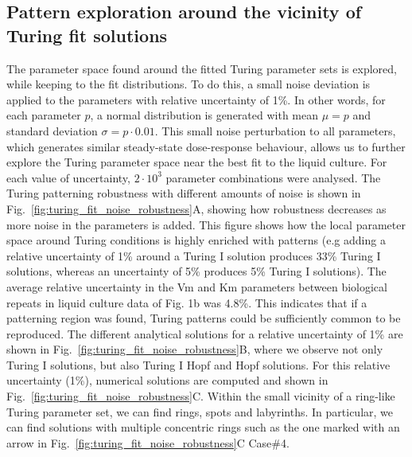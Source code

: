 \subsection{Pattern exploration around the vicinity of Turing fit solutions}
The parameter space found around the fitted Turing parameter sets is explored, while keeping to the fit distributions. To do this, a small noise deviation is applied to the parameters with relative uncertainty of 1\%.
In other words, for each parameter $p$, a normal distribution is generated with mean $\mu=p$ and standard deviation $\sigma=p\cdot 0.01$.
This small noise perturbation to all parameters, which generates similar steady-state dose-response behaviour, allows us to further explore the Turing parameter space near the best fit to the liquid culture.
For each value of uncertainty, $2\cdot10^3$ parameter combinations were analysed.
The Turing patterning robustness with different amounts of noise is shown in Fig.~\ref{fig:turing_fit_noise_robustness}A, showing how robustness decreases as more noise in the parameters is added.
This figure shows how the local parameter space around Turing conditions is highly enriched with patterns (e.g adding a relative uncertainty of 1\% around a Turing I solution produces 33\% Turing I solutions, whereas an uncertainty of 5\% produces 5\% Turing I solutions).
The average relative uncertainty in the Vm and Km parameters between biological repeats in liquid culture data of Fig. 1b was 4.8\%. This indicates that if a patterning region was found, Turing patterns could be sufficiently common to be reproduced.%
The different analytical solutions for a relative uncertainty of 1\% are shown in Fig.~\ref{fig:turing_fit_noise_robustness}B, where we observe not only Turing I solutions, but also Turing I Hopf and Hopf solutions.
For this relative uncertainty (1\%), numerical solutions are computed and shown in Fig.~\ref{fig:turing_fit_noise_robustness}C.
Within the small vicinity of a ring-like Turing parameter set, we can find rings, spots and labyrinths.
In particular, we can find solutions with multiple concentric rings such as the one marked with an arrow in Fig.~\ref{fig:turing_fit_noise_robustness}C Case\#4.

